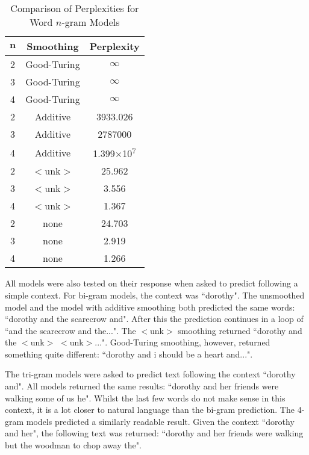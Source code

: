 \begin{table}[h!]
\caption{Comparison of Perplexities for Word $n$-gram Models}
\label{table:wordNGram}
\begin{center}
    \begin{tabular}{|c| c| c|}
    \hline
    $\boldsymbol{n}$ & \textbf{Smoothing} & \textbf{Perplexity} \\ \hline
       2 & Good-Turing & $\infty$ \\ \hline
    3 & Good-Turing & $\infty$ \\ \hline
    4 & Good-Turing& $\infty$ \\ \hline
        2 & Additive & 3933.026 \\ \hline
    3 & Additive & 2787000 \\ \hline
    4 & Additive & 1.399$\times$10\textsuperscript{7} \\ \hline
        2 & $<$unk$>$ & 25.962 \\ \hline
    3 & $<$unk$>$ & 3.556 \\ \hline
    4 & $<$unk$>$ & 1.367 \\ \hline
    2 & none & 24.703 \\ \hline
    3 & none & 2.919 \\ \hline
    4 & none & 1.266 \\ \hline


 
    \end{tabular}
    \end{center}
    \end{table}

All models were also tested on their response when asked to predict following a simple context. For bi-gram models, the context was ``dorothy". The unsmoothed model and the model with additive smoothing both predicted the same words: ``dorothy and the scarecrow and". After this the prediction continues in a loop of ``and the scarecrow and the...". The $<$unk$>$ smoothing returned ``dorothy and the $<$unk$>$ $<$unk$>$...". Good-Turing smoothing, however, returned something quite different: ``dorothy and i should be a heart and...". 

The tri-gram models were asked to predict text following the context ``dorothy and". All models returned the same results: ``dorothy and her friends were walking some of us he". Whilst the last few words do not make sense in this context, it is a lot closer to natural language than the bi-gram prediction. The 4-gram models predicted a similarly readable result. Given the context ``dorothy and her", the following text was returned: ``dorothy and her friends were walking but the woodman to chop away the".

